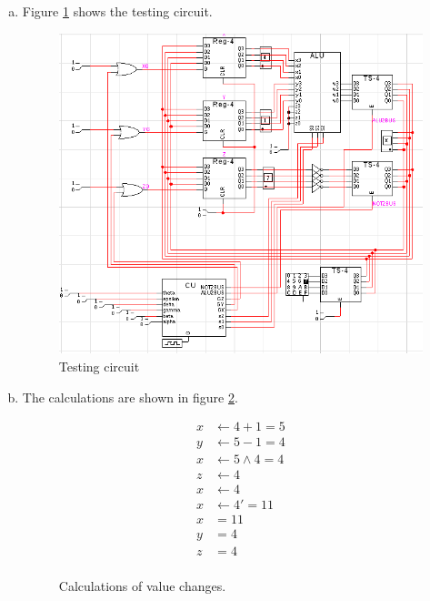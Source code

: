\documentclass{article}
\begin{document}
\begin{enumerate}
{\begin{enumerate}[(a)]
        \item{
          Figure \ref{tcirc} shows the testing circuit.
          \begin{figure}[h]
            \centering
            \includegraphics[width=300pt]{img/tcirc}
            \caption{\label{tcirc} Testing circuit}
          \end{figure}
        }

        \item{
          The calculations are shown in figure \ref{calc}.
          \begin{figure}
            \begin{align}
              x &\leftarrow 4 + 1 = 5 \\
              y &\leftarrow 5 - 1 = 4 \\
              x &\leftarrow 5 \land 4 = 4 \\
              z &\leftarrow 4 \\
              x &\leftarrow 4 \\
              x &\leftarrow 4' = 11 \\
              x &= 11 \\
              y &= 4 \\
              z &= 4 \\
            \end{align}
            \caption{\label{calc} Calculations of value changes.}
          \end{figure}
        }


\end{enumerate}}
\end{enumerate}
\end{document}
